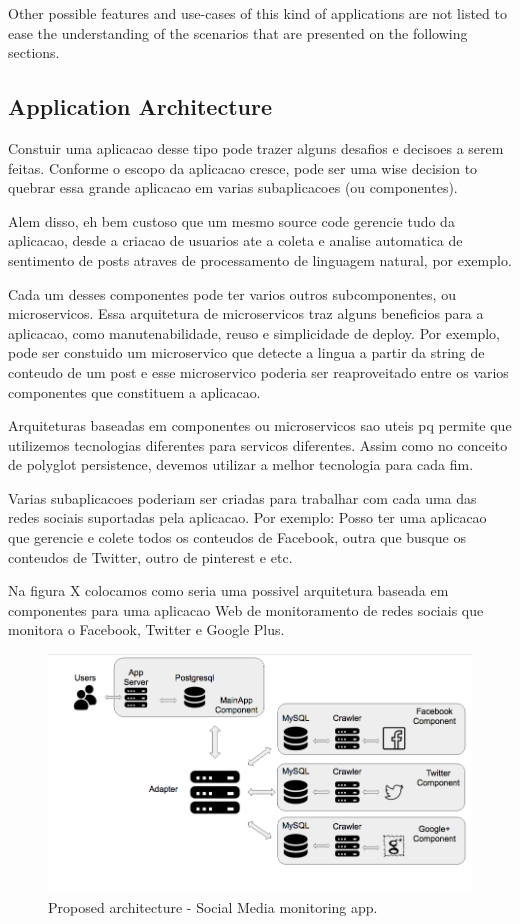 Other possible features and use-cases of this kind of applications are not listed to ease the understanding of the scenarios that are presented on the following sections.

\subsection{Application Architecture}
Constuir uma aplicacao desse tipo pode trazer alguns desafios e decisoes a serem feitas. Conforme o escopo da aplicacao cresce, pode ser uma wise decision to quebrar essa grande aplicacao em varias subaplicacoes (ou componentes). 

Alem disso, eh bem custoso que um mesmo source code gerencie tudo da aplicacao, desde a criacao de usuarios ate a coleta e analise automatica de sentimento de posts atraves de processamento de linguagem natural, por exemplo.

Cada um desses componentes pode ter varios outros subcomponentes, ou microservicos. Essa arquitetura de microservicos traz alguns beneficios para a aplicacao, como manutenabilidade, reuso e simplicidade de deploy. Por exemplo, pode ser constuido um microservico que detecte a lingua a partir da string de conteudo de um post e esse microservico poderia ser reaproveitado entre os varios componentes que constituem a aplicacao.   

Arquiteturas baseadas em componentes ou microservicos sao uteis pq permite que utilizemos tecnologias diferentes para servicos diferentes. Assim como no conceito de polyglot persistence, devemos utilizar a melhor tecnologia para cada fim.

Varias subaplicacoes poderiam ser criadas para trabalhar com cada uma das redes sociais suportadas pela aplicacao. Por exemplo: Posso ter uma aplicacao que gerencie e colete todos os conteudos de Facebook, outra que busque os conteudos 
de Twitter, outro de pinterest e etc. 

Na figura X colocamos como seria uma possivel arquitetura baseada em componentes para uma aplicacao Web de monitoramento de redes sociais que monitora o Facebook, Twitter e Google Plus.


\begin{figure}[ht!]
\centering
\includegraphics[width=120mm]{Imagens/apparchitecture.png}
\caption{Proposed architecture - Social Media monitoring app.\label{fig:apparchitecture}}
\end{figure}

